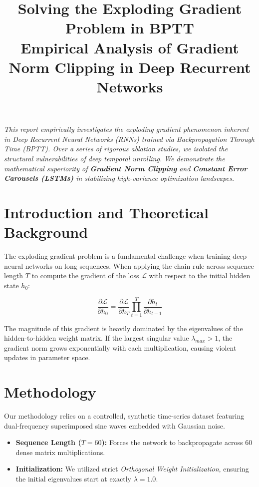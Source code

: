 \documentclass[11pt,a4paper]{article}
\title{\vspace{-2cm}\textbf{\color{primary} Solving the Exploding Gradient Problem in BPTT} \\ \Large \color{secondary} Empirical Analysis of Gradient Norm Clipping in Deep Recurrent Networks}
\begin{document}
\maketitle

\begin{tcolorbox}[colback=gray!5, colframe=primary!80, title=\textbf{Abstract}, boxrule=0.8pt, arc=3pt]
\textit{This report empirically investigates the exploding gradient phenomenon inherent in Deep Recurrent Neural Networks (RNNs) trained via Backpropagation Through Time (BPTT). Over a series of rigorous ablation studies, we isolated the structural vulnerabilities of deep temporal unrolling. We demonstrate the mathematical superiority of \textbf{Gradient Norm Clipping} and \textbf{Constant Error Carousels (LSTMs)} in stabilizing high-variance optimization landscapes.}
\end{tcolorbox}

\vspace{0.5cm}

\section{Introduction and Theoretical Background}
The exploding gradient problem is a fundamental challenge when training deep neural networks on long sequences. When applying the chain rule across sequence length $T$ to compute the gradient of the loss $\mathcal{L}$ with respect to the initial hidden state $h_0$:

\begin{tcolorbox}[colback=blue!5, colframe=blue!30, boxrule=0.5pt, arc=2pt]
\begin{equation}
\frac{\partial \mathcal{L}}{\partial h_0} = \frac{\partial \mathcal{L}}{\partial h_T} \prod_{t=1}^{T} \frac{\partial h_t}{\partial h_{t-1}}
\end{equation}
\end{tcolorbox}

The magnitude of this gradient is heavily dominated by the eigenvalues of the hidden-to-hidden weight matrix. If the largest singular value $\lambda_{max} > 1$, the gradient norm grows exponentially with each multiplication, causing violent updates in parameter space.

\section{Methodology}
Our methodology relies on a controlled, synthetic time-series dataset featuring dual-frequency superimposed sine waves embedded with Gaussian noise. 
\begin{itemize}[label=\textcolor{secondary}{\textbullet}]
    \item \textbf{Sequence Length ($T=60$):} Forces the network to backpropagate across 60 dense matrix multiplications.
    \item \textbf{Initialization:} We utilized strict \textit{Orthogonal Weight Initialization}, ensuring the initial eigenvalues start at exactly $\lambda = 1.0$.
\end{itemize}
\end{document}
